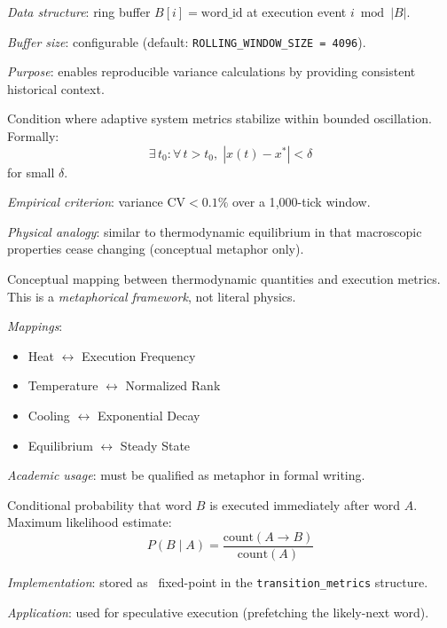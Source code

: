 \begin{description}
\textit{Data structure}: ring buffer $B[i] = \text{word\_id}$ at execution
event $i \bmod |B|$.

\textit{Buffer size}: configurable (default: \texttt{ROLLING\_WINDOW\_SIZE =
4096}).

\textit{Purpose}: enables reproducible variance calculations by providing
consistent historical context.

\item[Steady-State Equilibrium]
Condition where adaptive system metrics stabilize within bounded oscillation.
Formally:
\begin{equation*}
  \exists\, t_0\colon \forall\, t > t_0,\; |x(t) - x^*| < \delta
\end{equation*}
for small $\delta$.

\textit{Empirical criterion}: variance $\mathrm{CV} < 0.1\%$ over a
1{,}000-tick window.

\textit{Physical analogy}: similar to thermodynamic equilibrium in that
macroscopic properties cease changing (conceptual metaphor only).

\item[Thermodynamic Metaphor]
Conceptual mapping between thermodynamic quantities and execution metrics.
This is a \emph{metaphorical framework}, not literal physics.

\textit{Mappings}:
\begin{itemize}
  \item Heat $\leftrightarrow$ Execution Frequency
  \item Temperature $\leftrightarrow$ Normalized Rank
  \item Cooling $\leftrightarrow$ Exponential Decay
  \item Equilibrium $\leftrightarrow$ Steady State
\end{itemize}

\textit{Academic usage}: must be qualified as metaphor in formal writing.

\item[Transition Probability]
Conditional probability that word $B$ is executed immediately after word $A$.
Maximum likelihood estimate:
\begin{equation*}
  P(B \mid A) = \frac{\text{count}(A \to B)}{\text{count}(A)}
\end{equation*}

\textit{Implementation}: stored as \Qtype\ fixed-point in the
\texttt{transition\_metrics} structure.

\textit{Application}: used for speculative execution (prefetching the
likely-next word).


\end{description}
